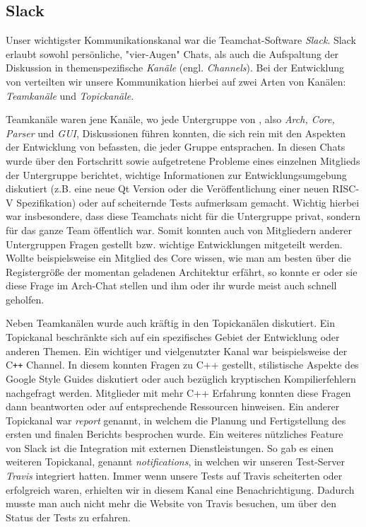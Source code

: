 
\subsection{Slack}
\label{team:group-slack}

Unser wichtigster Kommunikationskanal war die Teamchat-Software \emph{Slack}.
Slack erlaubt sowohl persönliche, "vier-Augen" Chats, als auch die Aufspaltung
der Diskussion in themenspezifische \emph{Kanäle} (engl. \emph{Channels}). Bei
der Entwicklung von \erasim{} verteilten wir unsere Kommunikation hierbei auf
zwei Arten von Kanälen: \emph{Teamkanäle} und \emph{Topickanäle}.

Teamkanäle waren jene Kanäle, wo jede Untergruppe von \erasim{}, also
\emph{Arch, Core, Parser} und \emph{GUI}, Diskussionen führen konnten, die sich
rein mit den Aspekten der Entwicklung von \erasim{} befassten, die jeder Gruppe
entsprachen. In diesen Chats wurde über den Fortschritt sowie aufgetretene
Probleme eines einzelnen Mitglieds der Untergruppe berichtet, wichtige
Informationen zur Entwicklungsumgebung diskutiert (z.B. eine neue Qt Version
oder die Veröffentlichung einer neuen RISC-V Spezifikation) oder auf scheiternde
Tests aufmerksam gemacht. Wichtig hierbei war insbesondere, dass diese Teamchats
nicht für die Untergruppe privat, sondern für das ganze \erasim{} Team
öffentlich war. Somit konnten auch von Mitgliedern anderer Untergruppen Fragen
gestellt bzw. wichtige Entwicklungen mitgeteilt werden. Wollte beispielsweise
ein Mitglied des Core wissen, wie man am besten über die Registergröße der
momentan geladenen Architektur erfährt, so konnte er oder sie diese Frage im
Arch-Chat stellen und ihm oder ihr wurde meist auch schnell geholfen.

Neben Teamkanälen wurde auch kräftig in den Topickanälen diskutiert. Ein
Topickanal beschränkte sich auf ein spezifisches Gebiet der Entwicklung oder
anderen Themen. Ein wichtiger und vielgenutzter Kanal war beispielsweise der
C\texttt{++} Channel. In diesem konnten Fragen zu C++ gestellt, stilistische
Aspekte des Google Style Guides diskutiert oder auch bezüglich kryptischen
Kompilierfehlern nachgefragt werden. Mitglieder mit mehr C++ Erfahrung konnten
diese Fragen dann beantworten oder auf entsprechende Ressourcen hinweisen. Ein
anderer Topickanal war \emph{report} genannt, in welchem die Planung und
Fertigstellung des ersten und finalen Berichts besprochen wurde. Ein weiteres
nützliches Feature von Slack ist die Integration mit externen Dienstleistungen.
So gab es einen weiteren Topickanal, genannt \emph{notifications}, in welchen
wir unseren Test-Server \emph{Travis} integriert hatten. Immer wenn unsere Tests
auf Travis scheiterten oder erfolgreich waren, erhielten wir in diesem Kanal
eine Benachrichtigung. Dadurch musste man auch nicht mehr die Website von Travis
besuchen, um über den Status der Tests zu erfahren.

